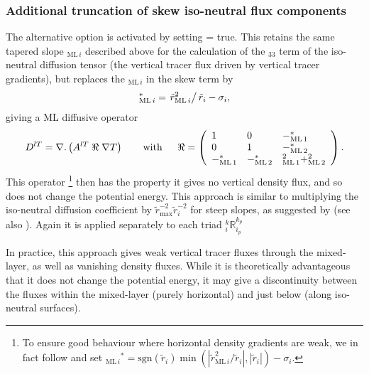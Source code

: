 \documentclass[../main/NEMO_manual]{subfiles}
\newcommand{\rML}[1][i]{\ensuremath{_{\mathrm{ML}\,#1}}}
\newcommand{\rMLt}[1][i]{\tilde{r}_{\mathrm{ML}\,#1}}
\begin{document}
\subsubsection{Additional truncation of skew iso-neutral flux components}
\label{subsec:TRIADS_Gerdes-taper}

The alternative option is activated by setting  = true.
This retains the same tapered slope $\rML$  described above for the calculation of the $_{33}$ term of
the iso-neutral diffusion tensor (the vertical tracer flux driven by vertical tracer gradients),
but replaces the $\rML$ in the skew term by
\begin{equation}
  \label{eq:TRIADS_rm*}
  \rML^*=\left.\rMLt^2\right/\tilde{r}_i-\sigma_i,
\end{equation}
giving a ML diffusive operator
\[
  D^{lT}=\nabla {\mathrm {\mathbf .}}\left( {A^{lT}\;\Re \;\nabla T} \right) \qquad
  \mbox{with}\quad \;\;\Re =\left( {{
        \begin{array}{*{20}c}
          1 \hfill & 0 \hfill & {-\rML[1]^*}\hfill \\
          0 \hfill & 1 \hfill & {-\rML[2]^*} \hfill \\
          {-\rML[1]^*}\hfill &   {-\rML[2]^*} \hfill & {\rML[1]^2+\rML[2]^2} \hfill \\
        \end{array}
      }} \right).
\]
This operator
\footnote{
  To ensure good behaviour where horizontal density gradients are weak,
  we in fact follow \citet{gerdes.koberle.ea_CD91} and
  set $\rML^*=\mathrm{sgn}(\tilde{r}_i)\min(|\rMLt^2/\tilde{r}_i|,|\tilde{r}_i|)-\sigma_i$.
}
then has the property it gives no vertical density flux, and so does not change the potential energy.
This approach is similar to multiplying the iso-neutral diffusion coefficient by
$\tilde{r}_{\mathrm{max}}^{-2}\tilde{r}_i^{-2}$ for steep slopes,
as suggested by \citet{gerdes.koberle.ea_CD91} (see also \citet{griffies_bk04}).
Again it is applied separately to each triad $_i^k\mathbb{R}_{i_p}^{k_p}$

In practice, this approach gives weak vertical tracer fluxes through the mixed-layer,
as well as vanishing density fluxes.
While it is theoretically advantageous that it does not change the potential energy,
it may give a discontinuity between the fluxes within the mixed-layer (purely horizontal) and
just below (along iso-neutral surfaces).
\end{document}
